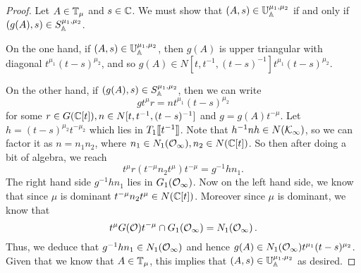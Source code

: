 \documentclass[draft]{article}
\begin{document}
\begin{proof}
 Let $ A \in \TT_\mu$ and $ s \in \CC $. We must show that  $ (A,s) \in \UU^{\mu_1, \mu_2}_\AA $ if and only if $ (g(A),s) \in S^{\mu_1, \mu_2}_\AA $.
 
 On the one hand, if $ (A,s) \in \UU^{\mu_1, \mu_2}_\AA $, then $ g(A)$ is upper triangular with diagonal $ t^{\mu_1} (t-s)^{\mu_2}$, and so $ g(A) \in N[t, t^{-1}, (t-s)^{-1}] t^{\mu_1} (t-s)^{\mu_2}$.
 
 On the other hand, if $ (g(A), s) \in S^{\mu_1, \mu_2}_\AA$, then we can write 
 $$
 g t^\mu r= n t^{\mu_1} (t-s)^{\mu_2}
$$
for some $ r \in G(\CC[t]), n \in N[t, t^{-1}, (t-s)^{-1}] $ and $ g = g(A)t^{-\mu}$.  Let $ h = (t-s)^{\mu_2} t^{-\mu_2}$ which lies in $ T_1\xt[t^{-1}] $.
Note that $ h^{-1}n h \in N(\Kinf)$, 
so we can factor it as $ n = n_1 n_2 $, where $ n_1 \in N_1(\Oinf), n_2 \in N(\CC[t])$.  So then after doing a bit of algebra, we reach
$$
t^\mu r (t^{-\mu} n_2 t^\mu) t^{-\mu} = g^{-1} h n_1.
$$
The right hand side $ g^{-1} h n_1 $ lies in $ G_1(\Oinf) $.  Now on the left hand side, we know that since $ \mu $ is dominant $ t^{-\mu} n_2 t^\mu \in N(\CC[t])$.  
Moreover since $ \mu $ is dominant, we know that 
$$t^\mu G(\cO) t^{-\mu} \cap G_1(\Oinf) = N_1(\Oinf)\,.$$
Thus, we deduce that $ g^{-1} h n_1 \in N_1(\Oinf)$ 
and hence $ g(A) \in N_1(\Oinf) t^{\mu_1} (t-s)^{\mu_2} $.  Given that we know that $ A \in \TT_\mu $, this implies that $ (A,s) \in \UU^{\mu_1, \mu_2}_\AA$ as desired.
\end{proof}

\end{document}
